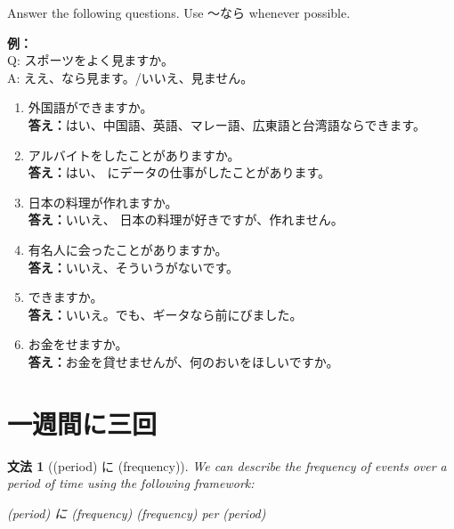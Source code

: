 \documentclass[notoc,notitlepage]{tufte-book}
\newtheorem{grammar}{\faBook \enspace 文法}[section]
\begin{document}
\begin{ex}
  Answer the following questions. Use 〜なら whenever possible.

  \textbf{例：}\\
  \noindent Q: スポーツをよく見ますか。\\
  \noindent A: ええ、なら見ます。/いいえ、見ません。

  \begin{enumerate}
    \item 外国語ができますか。\\
      \textbf{答え：}はい、中国語、英語、マレー語、広東語と台湾語ならできます。 
    \item アルバイトをしたことがありますか。\\
      \textbf{答え：}はい、 にデータの仕事がしたことがあります。
    \item 日本の料理が作れますか。\\
      \textbf{答え：}いいえ、 日本の料理が好きですが、作れません。
    \item 有名人に会ったことがありますか。\\
      \textbf{答え：}いいえ、そういうがないです。 
    \item {}できますか。\\
      \textbf{答え：}いいえ。でも、ギータなら前にびました。 
    \item お金をせますか。\\
      \textbf{答え：}お金を貸せませんが、何のおいをほしいですか。 
  \end{enumerate}
\end{ex}


\section{一週間に三回}%
\label{sec:yi_zhou_jian_nisan_hui_}

\begin{grammar}[(period) に (frequency)]
\label{grammar:_period_ni_frequency_}
  We can describe the frequency of events over a period of time using the following framework:
  \begin{center}
    (period) に (frequency) \qquad (frequency) per (period)
  \end{center}
\end{grammar}
\end{document}

